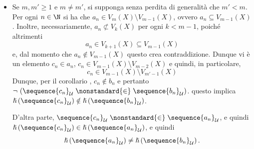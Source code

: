 {\begin{itemize}
        Dunque si ha che \begin{equation*}
            \sequence{c_{n}}_{\mathcal{U}}\mathrel{\nonstandard{\in}}\sequence{a_{n}}_{\mathcal{U}},\quad \lnot\,\left(\sequence{c_{n}}_{\mathcal{U}}\mathrel{\nonstandard{\in}}\sequence{b_{n}}_{\mathcal{U}}\right)
        \end{equation*}e pertanto per la definizione di $ \hslash $, \begin{equation*}
            \hslash\left(\sequence{c_{n}}_{\mathcal{U}}\right) \in \hslash\left(\sequence{a_{n}}_{\mathcal{U}}\right),\qquad 
            \lnot\,\left(\hslash\left(\sequence{c_{n}}_{\mathcal{U}}\right) \in \hslash\left(\sequence{b_{n}}_{\mathcal{U}}\right)\right),
        \end{equation*}e quindi, ovviamente, $ \hslash\left(\sequence{a_{n} }_{\mathcal{U}}\right) \neq \hslash\left(\sequence{b_{n} }_{\mathcal{U}}\right) $.
        \item Se $ m,m'\ge 1 $ e $ m\neq m' $, si supponga senza perdita di generalità che $ m'<m $. Per ogni $ n \in \N $ si ha che $ a_{n} \in V_{m}(X)\setminus V_{m-1}(X)$, ovvero $ a_{n} \subseteq V_{m-1}(X)$. Inoltre, necessariamente, $ a_{n} \not\subset V_{k}(X)$ per ogni $ k<m-1 $, poiché altrimenti \begin{equation*}
            a_{n} \in V_{k+1}(X)  \subseteq V_{m-1}(X) 
        \end{equation*}e, dal momento che $ a_{n} \notin V_{m-1}(X)   $ questo crea contraddizione. Dunque vi è un elemento $ c_{n} \in a_{n} $, $ c_{n} \in V_{m-1}(X)\setminus V_{m-2}(X)$ e quindi, in particolare, \begin{equation*}
            c_{n} \in V_{m-1}(X) \setminus V_{m'-1}(X)   
        \end{equation*}Dunque, per il corollario , $ c_{n} \notin b_{n} $ e pertanto $ \lnot\,\left(\sequence{c_{n} }_{\mathcal{U}}\mathrel{\nonstandard{\in}}\sequence{b_{n}}_{\mathcal{U}}\right) $. questo implica $ \hslash\left(\sequence{c_{n} }_{\mathcal{U}}\right)\notin \hslash\left(\sequence{b_{n} }_{\mathcal{U}}\right) $. 

        D'altra parte, $ \sequence{c_{n}}_{\mathcal{U}} \mathrel{\nonstandard{\in}}\sequence{a_{n} }_{\mathcal{U}} $, e quindi $ \hslash\left(\sequence{c_{n} }_{\mathcal{U}}\right)\in \hslash\left(\sequence{a_{n} }_{\mathcal{U}}\right) $, e quindi \begin{equation*}
            \hslash\left(\sequence{a_{n} }_{\mathcal{U}}\right) \neq \hslash\left(\sequence{b_{n} }_{\mathcal{U}}\right).
        \end{equation*}
    \end{itemize}

}
